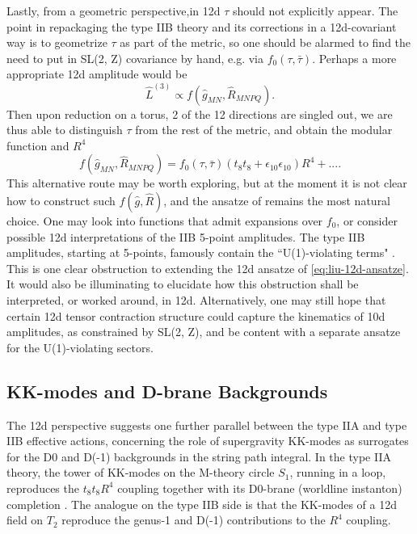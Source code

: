 Lastly, from a geometric perspective,in 12d $\tau$ should not explicitly appear. 
The point in repackaging the type IIB theory and its corrections in a 12d-covariant way is to geometrize $\tau$ as part of the metric, so one should be alarmed to find the need to put in SL(2, Z) covariance by hand, e.g. via $f_0(\tau,\bar\tau)$.
Perhaps a more appropriate 12d amplitude would be
\begin{equation}
\hat{L}^{(3)} \propto f(\hat{g}_{MN},\hat{R}_{MNPQ}).
\end{equation}
Then upon reduction on a torus, 2 of the 12 directions are singled out, we are thus able to distinguish $\tau$ from the rest of the metric, and obtain the modular function and $R^4$
\begin{equation}
f(\hat{g}_{MN},\hat{R}_{MNPQ})
= f_0(\tau,\bar\tau)(t_8t_8 + \epsilon_{10}\epsilon_{10})R^4 + ....
\end{equation}
This alternative route may be worth exploring, but at the moment it is not clear how to construct such $f(\hat{g},\hat{R})$, and the ansatze of \cite{Minasian:2015bxa} remains the most natural choice.
One may look into functions that admit expansions over $f_0$, or consider possible 12d interpretations of the IIB 5-point amplitudes.
The type IIB amplitudes, starting at 5-points, famously contain the ``U(1)-violating terms" \cite{Liu:2025uqu}. This is one clear obstruction to extending the 12d ansatze of \eqref{eq:liu-12d-ansatze}.
It would also be illuminating to elucidate how this obstruction shall be interpreted, or worked around, in 12d.
Alternatively, one may still hope that certain 12d tensor contraction structure could capture the kinematics of 10d amplitudes, as constrained by SL(2, Z), and be content with a separate ansatze for the U(1)-violating sectors.





\subsection{KK-modes and D-brane Backgrounds}
\label{sec:KK modes}
The 12d perspective suggests one further parallel between the type IIA and type IIB effective actions, concerning the role of supergravity KK-modes as surrogates for the D0 and D(-1) backgrounds in the string path integral.
In the type IIA theory, the tower of KK-modes on the M-theory circle $S_1$, running in a loop, reproduces the $t_8t_8R^4$ coupling together with its D0-brane (worldline instanton) completion \cite{Green:1997as}.
The analogue on the type IIB side is that the KK-modes of a 12d field on $T_2$ reproduce the genus-1 and D(-1) contributions to the $R^4$ coupling.

